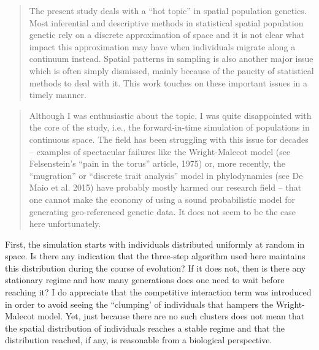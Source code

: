 
\begin{quote}
    The present study deals with a ``hot topic'' in spatial population genetics. Most
    inferential and descriptive methods in statistical spatial population
    genetic rely on a discrete approximation of space and it is not clear what
    impact this approximation may have when individuals migrate along a
    continuum instead. Spatial patterns in sampling is also another major issue
    which is often simply dismissed, mainly because of the paucity of
    statistical methods to deal with it. This work touches on these important
    issues in a timely manner.
\end{quote}

\begin{quote}
    Although I was enthusiastic about the topic, I was quite disappointed with
    the core of the study, i.e., the forward-in-time simulation of populations in
    continuous space. The field has been struggling with this issue for decades --
    examples of spectacular failures like the Wright-Malecot model (see
    Felsenstein's ``pain in the torus'' article, 1975) or, more recently, the
    ``mugration'' or ``discrete trait analysis'' model in phylodynamics (see De Maio
    et al. 2015) have probably mostly harmed our research field -- that one cannot
    make the economy of using a sound probabilistic model for generating
    geo-referenced genetic data. It does not seem to be the case here
    unfortunately.  
\end{quote}

\begin{point}{}
    First, the simulation starts with individuals distributed uniformly at random in space. Is there any indication that the three-step algorithm used here maintains this distribution during the course of evolution? If it does not, then is there any stationary regime and how many generations does one need to wait before reaching it? I do appreciate that the competitive interaction term was introduced in order to avoid seeing the ``clumping' of individuals that hampers the Wright-Malecot model. Yet, just because there are no such clusters does not mean that the spatial distribution of individuals reaches a stable regime and that the distribution reached, if any, is reasonable from a biological perspective.
\end{point}


